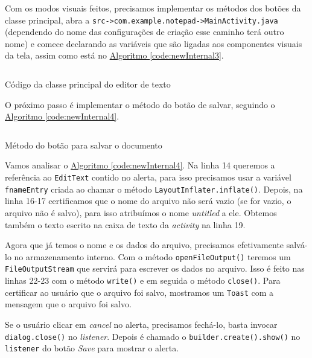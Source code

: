 \documentclass[a4paper,12pt,brazil,oneside]{book}
\begin{document}
		Com os modos visuais feitos, precisamos implementar os métodos dos botões da classe principal, abra a \texttt{src->com.example.notepad->MainActivity.java} (dependendo do nome das configurações de criação esse caminho terá outro nome) e comece declarando as variáveis que são ligadas aos componentes visuais da tela, assim como está no \hyperref[code:newInternal3]{Algoritmo \ref*{code:newInternal3}}.
		
		\begin{listing}[H]
		\inputminted[linenos=true,fontsize=\small,frame=lines, framesep=2mm, tabsize=2,numbersep=5pt]{java}{src/api/storage/newInternal1.java}
		\caption{Código da classe principal do editor de texto}
		\label{code:newInternal3}
		\end{listing} 
		
		O próximo passo é implementar o método do botão de salvar, seguindo o \hyperref[code:newInternal4]{Algoritmo \ref*{code:newInternal4}}.
		
		\begin{listing}[H]
		\inputminted[linenos=true,fontsize=\small,frame=lines, framesep=2mm, tabsize=2,numbersep=5pt]{java}{src/api/storage/newInternal2.java}
		\caption{Método do botão para salvar o documento}
		\label{code:newInternal4}
		\end{listing} 
		
		Vamos analisar o \hyperref[code:newInternal4]{Algoritmo \ref*{code:newInternal4}}. Na linha 14 queremos a referência ao \texttt{EditText} contido no alerta, para isso precisamos usar a variável \texttt{fnameEntry} criada ao chamar o método \texttt{LayoutInflater.inflate()}. Depois, na linha 16-17 certificamos que o nome do arquivo não será vazio (se for vazio, o arquivo não é salvo), para isso atribuímos o nome \emph{untitled} a ele. Obtemos também o texto escrito na caixa de texto da \emph{activity} na linha 19.

		Agora que já temos o nome e os dados do arquivo, precisamos efetivamente salvá-lo no armazenamento interno. Com o método \texttt{openFileOutput()} teremos um \texttt{FileOutputStream} que servirá para escrever os dados no arquivo. Isso é feito nas linhas 22-23 com o método \texttt{write()} e em seguida o método \texttt{close()}.
		Para certificar ao usuário que o arquivo foi salvo, mostramos um \texttt{Toast} com a mensagem que o arquivo foi salvo.

		Se o usuário clicar em \emph{cancel} no alerta, precisamos fechá-lo, basta invocar \texttt{dialog.close()} no \emph{listener}. Depois é chamado o \texttt{builder.create().show()} no \texttt{listener} do botão \emph{Save} para mostrar o alerta.
		
\end{document}
